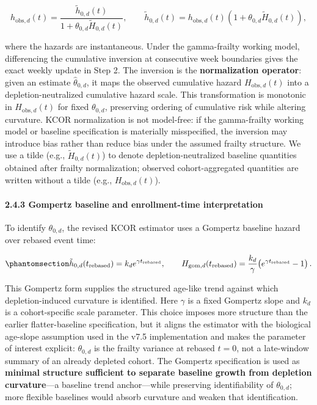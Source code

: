 \documentclass[
]{article}
\begin{document}
\[h_{\mathrm{obs},d}(t)=\frac{\tilde h_{0,d}(t)}{1+\theta_{0,d}\tilde H_{0,d}(t)},
\qquad
\tilde h_{0,d}(t)=h_{\mathrm{obs},d}(t)\left(1+\theta_{0,d}\tilde H_{0,d}(t)\right),\]

where the hazards are instantaneous. Under the gamma-frailty working model, differencing the cumulative inversion at consecutive week boundaries gives the exact weekly update in Step 2. The inversion is the \textbf{normalization operator}: given an estimate \(\hat{\theta}_{0,d}\), it maps the observed cumulative hazard \(H_{\mathrm{obs},d}(t)\) into a depletion-neutralized cumulative hazard scale. This transformation is monotonic in \(H_{\mathrm{obs},d}(t)\) for fixed \(\theta_{0,d}\), preserving ordering of cumulative risk while altering curvature. KCOR normalization is not model-free: if the gamma-frailty working model or baseline specification is materially misspecified, the inversion may introduce bias rather than reduce bias under the assumed frailty structure. We use a tilde (e.g., \(\tilde H_{0,d}(t)\)) to denote depletion-neutralized baseline quantities obtained after frailty normalization; observed cohort-aggregated quantities are written without a tilde (e.g., \(H_{\mathrm{obs},d}(t)\)).

\paragraph{2.4.3 Gompertz baseline and enrollment-time interpretation}\label{gompertz-baseline-and-enrollment-time-interpretation}

To identify \(\theta_{0,d}\), the revised KCOR estimator uses a Gompertz baseline hazard over rebased event time:

\begin{equation}\protect\phantomsection\label{eq:baseline-shape-default}{\tilde h_{0,d}(t_{\mathrm{rebased}})=k_d e^{\gamma t_{\mathrm{rebased}}},
\qquad
H_{\mathrm{gom},d}(t_{\mathrm{rebased}})=\frac{k_d}{\gamma}\!\left(e^{\gamma t_{\mathrm{rebased}}}-1\right).}\end{equation}

This Gompertz form supplies the structured age-like trend against which depletion-induced curvature is identified. Here \(\gamma\) is a fixed Gompertz slope and \(k_d\) is a cohort-specific scale parameter. This choice imposes more structure than the earlier flatter-baseline specification, but it aligns the estimator with the biological age-slope assumption used in the v7.5 implementation and makes the parameter of interest explicit: \(\theta_{0,d}\) is the frailty variance at rebased \(t=0\), not a late-window summary of an already depleted cohort. The Gompertz specification is used as \textbf{minimal structure sufficient to separate baseline growth from depletion curvature}---a baseline trend anchor---while preserving identifiability of \(\theta_{0,d}\); more flexible baselines would absorb curvature and weaken that identification.
\end{document}

